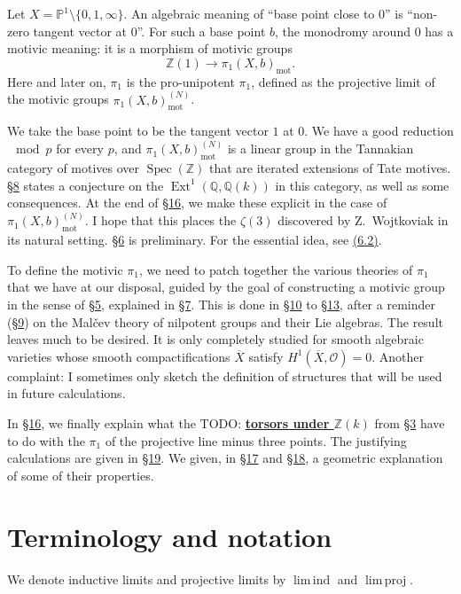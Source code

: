 \documentclass{article}
\theoremstyle{definition}
\newenvironment{env}[1]
    {\renewcommand\theinnerenv{(#1)}\innerenv}
    {\endinnerenv}
\newcommand{\mot}{\mathrm{mot}}
\newcommand{\scr}[1]{{\mathscr{#1}}}
\newcommand{\bb}{\mathbb}
\newcommand{\PP}{\bb{P}}
\newcommand{\ZZ}{\bb{Z}}
\newcommand{\QQ}{\bb{Q}}
\DeclareMathOperator{\Ext}{Ext}
\DeclareMathOperator{\Spec}{Spec}
\DeclareMathOperator{\limind}{lim\,ind}
\DeclareMathOperator{\limproj}{lim\,proj}
\newcommand{\unsure}[1]{TODO: \underline{\textbf{#1}}}
\newcommand{\oldpage}[1]{\marginpar{\footnotesize$\Big\vert$ \textit{p.~#1}}}
\begin{document}
Let $X=\PP^1\setminus\{0,1,\infty\}$.
An algebraic meaning of ``base point close to $0$'' is ``non-zero tangent vector at $0$''.
For such a base point $b$, the monodromy around $0$ has a motivic meaning: it is a morphism of motivic groups
\[
  \ZZ(1) \to \pi_1(X,b)_\mot.
\]
Here and later on, $\pi_1$ is the pro-unipotent $\pi_1$, defined as the projective limit of the motivic groups $\pi_1(X,b)_\mot^{(N)}$.

We take the base point to be the tangent vector $1$ at $0$.
We have a good reduction $\mod p$ for every $p$, and $\pi_1(X,b)_\mot^{(N)}$ is a linear group in the Tannakian category of motives over $\Spec(\ZZ)$ that are iterated extensions of Tate motives.
\hyperref[8]{\S8} states a conjecture on the $\Ext^1(\QQ,\QQ(k))$ in this category, as well as some consequences.
At the end of \hyperref[16]{\S16}, we make these explicit in the case of $\pi_1(X,b)_\mot^{(N)}$.
I hope that this places the $\zeta(3)$ discovered by Z.~Wojtkoviak in its natural setting.
\hyperref[6]{\S6} is preliminary.
For the essential idea, see \hyperref[6.2]{(6.2)}.

To define the motivic $\pi_1$, we need to patch together the various theories of $\pi_1$ that we have at our disposal, guided by the goal of constructing a motivic group in the sense of \hyperref[5]{\S5}, explained in \hyperref[7]{\S7}.
This is done in \hyperref[10]{\S10} to \hyperref[13]{\S13}, after a reminder (\hyperref[9]{\S9}) on the Mal\v{c}ev theory of nilpotent groups and their Lie algebras.
The result leaves much to be desired.
It is only completely studied for smooth algebraic varieties whose smooth compactifications $\overline{X}$ satisfy $H^1(\overline{X},\scr{O})=0$.
Another complaint: I sometimes only sketch the definition of structures that will be used in future calculations.

In \hyperref[16]{\S16}, we finally explain what the \unsure{torsors under $\ZZ(k)$} from \hyperref[3]{\S3} have to do with the $\pi_1$ of the projective line minus three points.
The justifying calculations are given in \hyperref[19]{\S19}.
We given, in \hyperref[17]{\S17} and \hyperref[18]{\S18}, a geometric explanation of some of their properties.

\oldpage{87}
\section{Terminology and notation}
\label{0}

\begin{env}{0.1}
\label{0.1}
  We denote inductive limits and projective limits by $\limind$ and $\limproj$.
\end{env}
\end{document}
